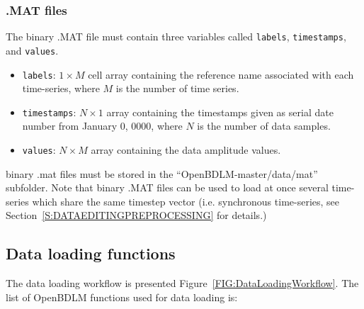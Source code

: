 \subsubsection{\MATLAB{} .MAT files}
\label{SS:MATInput}

The \MATLAB{} binary .MAT file must contain three \MATLAB{} variables called \lstinline[basicstyle = \mlttfamily \small]!labels!, \lstinline[basicstyle = \mlttfamily \small]!timestamps!, and \lstinline[basicstyle = \mlttfamily \small]!values!.
\begin{itemize}
\item \lstinline[basicstyle = \mlttfamily \small]!labels!: $1\times M$ cell array containing the reference name associated with each time-series, where $M$ is the number of time series.
\item \lstinline[basicstyle = \mlttfamily \small]!timestamps!: $N\times 1$ array containing the timestamps given as serial date number from January 0, 0000, where $N$ is the number of data samples.
\item \lstinline[basicstyle = \mlttfamily \small]!values!: $N\times M$ array containing the data amplitude values.
\end{itemize}
 \MATLAB{} binary .mat files must be stored in the ``OpenBDLM-master/data/mat'' subfolder.
Note that \MATLAB{} binary .MAT files can be used to load at once several time-series which share the same timestep vector (i.e. synchronous time-series, see Section~\ref{S:DATAEDITINGPREPROCESSING}  for details.)


\subsection{Data loading functions}

The data loading workflow is presented Figure~\ref{FIG:DataLoadingWorkflow}. The list of OpenBDLM functions used for data loading is:

